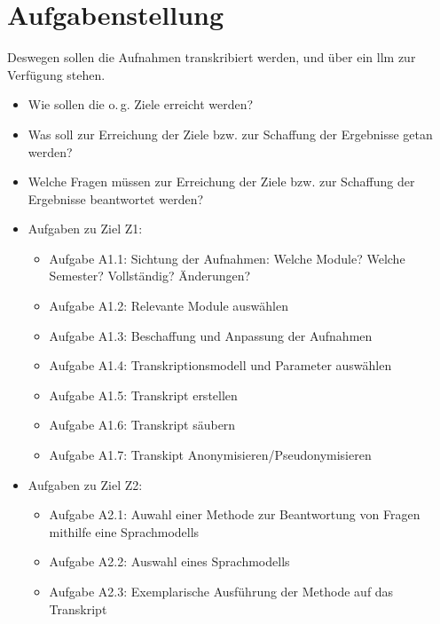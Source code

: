 \section{Aufgabenstellung}

Deswegen sollen die Aufnahmen transkribiert werden, und über ein \ac{llm} zur Verfügung stehen.

\begin{itemize}
\item Wie sollen die o.\,g. Ziele erreicht werden?
\item Was soll zur Erreichung der Ziele bzw. zur Schaffung der Ergebnisse getan werden?
\item Welche Fragen müssen zur Erreichung der Ziele bzw. zur Schaffung der Ergebnisse beantwortet  werden?
\end{itemize}

\begin{itemize}
\item Aufgaben zu Ziel Z1:
	\begin{itemize}
	\item Aufgabe A1.1: Sichtung der Aufnahmen: Welche Module? Welche Semester? Vollständig? Änderungen?
	\item Aufgabe A1.2: Relevante Module auswählen
	\item Aufgabe A1.3: Beschaffung und Anpassung der Aufnahmen
	\item Aufgabe A1.4: Transkriptionsmodell und Parameter auswählen
	\item Aufgabe A1.5: Transkript erstellen
	\item Aufgabe A1.6: Transkript säubern
	\item Aufgabe A1.7: Transkipt Anonymisieren/Pseudonymisieren
	\end{itemize}
\item Aufgaben zu Ziel Z2:
	\begin{itemize}
	\item Aufgabe A2.1: Auwahl einer Methode zur Beantwortung von Fragen mithilfe eine Sprachmodells 
	\item Aufgabe A2.2: Auswahl eines Sprachmodells
	\item Aufgabe A2.3: Exemplarische Ausführung der Methode auf das Transkript
	\end{itemize}
\end{itemize}
